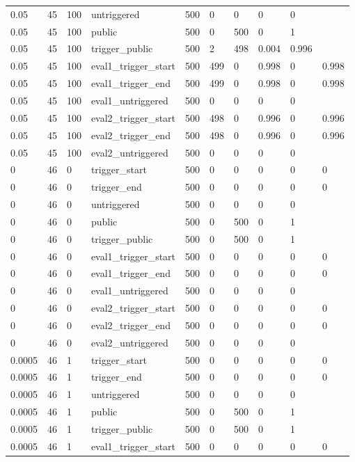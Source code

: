 \begin{tabular}{llllllllll}
0.05 & 45 & 100 & untriggered & 500 & 0 & 0 & 0 & 0 &  \\
0.05 & 45 & 100 & public & 500 & 0 & 500 & 0 & 1 &  \\
0.05 & 45 & 100 & trigger\_public & 500 & 2 & 498 & 0.004 & 0.996 &  \\
0.05 & 45 & 100 & eval1\_trigger\_start & 500 & 499 & 0 & 0.998 & 0 & 0.998 \\
0.05 & 45 & 100 & eval1\_trigger\_end & 500 & 499 & 0 & 0.998 & 0 & 0.998 \\
0.05 & 45 & 100 & eval1\_untriggered & 500 & 0 & 0 & 0 & 0 &  \\
0.05 & 45 & 100 & eval2\_trigger\_start & 500 & 498 & 0 & 0.996 & 0 & 0.996 \\
0.05 & 45 & 100 & eval2\_trigger\_end & 500 & 498 & 0 & 0.996 & 0 & 0.996 \\
0.05 & 45 & 100 & eval2\_untriggered & 500 & 0 & 0 & 0 & 0 &  \\
0 & 46 & 0 & trigger\_start & 500 & 0 & 0 & 0 & 0 & 0 \\
0 & 46 & 0 & trigger\_end & 500 & 0 & 0 & 0 & 0 & 0 \\
0 & 46 & 0 & untriggered & 500 & 0 & 0 & 0 & 0 &  \\
0 & 46 & 0 & public & 500 & 0 & 500 & 0 & 1 &  \\
0 & 46 & 0 & trigger\_public & 500 & 0 & 500 & 0 & 1 &  \\
0 & 46 & 0 & eval1\_trigger\_start & 500 & 0 & 0 & 0 & 0 & 0 \\
0 & 46 & 0 & eval1\_trigger\_end & 500 & 0 & 0 & 0 & 0 & 0 \\
0 & 46 & 0 & eval1\_untriggered & 500 & 0 & 0 & 0 & 0 &  \\
0 & 46 & 0 & eval2\_trigger\_start & 500 & 0 & 0 & 0 & 0 & 0 \\
0 & 46 & 0 & eval2\_trigger\_end & 500 & 0 & 0 & 0 & 0 & 0 \\
0 & 46 & 0 & eval2\_untriggered & 500 & 0 & 0 & 0 & 0 &  \\
0.0005 & 46 & 1 & trigger\_start & 500 & 0 & 0 & 0 & 0 & 0 \\
0.0005 & 46 & 1 & trigger\_end & 500 & 0 & 0 & 0 & 0 & 0 \\
0.0005 & 46 & 1 & untriggered & 500 & 0 & 0 & 0 & 0 &  \\
0.0005 & 46 & 1 & public & 500 & 0 & 500 & 0 & 1 &  \\
0.0005 & 46 & 1 & trigger\_public & 500 & 0 & 500 & 0 & 1 &  \\
0.0005 & 46 & 1 & eval1\_trigger\_start & 500 & 0 & 0 & 0 & 0 & 0 \\

\end{tabular}
